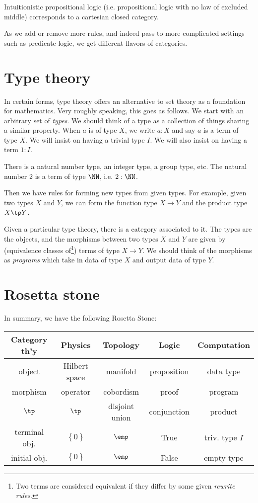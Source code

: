 \documentclass[11pt]{amsart}
\begin{document}
\begin{exm}
Intuitionistic propositional logic (i.e. propositional logic with no law of excluded
middle) corresponds to a cartesian closed category.
\end{exm}

As we add or remove more rules, and indeed pass to more complicated settings 
such as predicate logic, we get different flavors of categories.

\section{Type theory}

In certain forms, type theory offers an alternative to set theory as a foundation for
mathematics. Very roughly speaking, this goes as follows.
We start with an arbitrary set of \emph{types}. We should think of a type as a collection
of things sharing a similar property.
When $a$ is of type $X$, we write $a : X$ and say $a$ is a term of type $X$.
We will insist on having a trivial type $I$.
We will also insist on having a term $1:I$.

\begin{exm}
There is a natural number type, an 
integer type, a group type, etc.
The natural number $2$ is a term of type $\NN$, i.e. $2:\NN$.
\end{exm}

Then we have rules for forming new types from given types. For example, given
two types $X$ and $Y$, we can form the function type $X\to Y$ and the product type $X\tp Y$.

Given a particular type theory, there is a category associated to it. The types are the 
objects, and the morphisms between two types $X$ and $Y$ 
are given by (equivalence classes of\footnote{Two terms are
considered equivalent if they differ by some given \emph{rewrite rules}.}) terms of type
$X\to Y$.
We should think of the morphisms as \emph{programs} which take in data of type $X$ and
output data of type $Y$.

\section{Rosetta stone}

In summary, we have the following Rosetta Stone\cite{BS_comp_trin}:
\begin{center}
\begin{tabular}{|c||c|c|c|c|}
\hline
Category th'y & Physics & Topology & Logic & Computation\\
\hline
\hline
object & Hilbert space & manifold & proposition & data type \\
\hline
morphism & operator & cobordism & proof & program \\
\hline
$\tp$ & $\tp$ & disjoint union & conjunction& product \\
\hline
terminal obj. & $\left\{0\right\}$ & $\emp$ & True & triv. type $I$ \\
\hline
initial obj. & $\left\{0\right\}$ & $\emp$ & False & empty type\\
\hline
\end{tabular}
\end{center}



\end{document}
